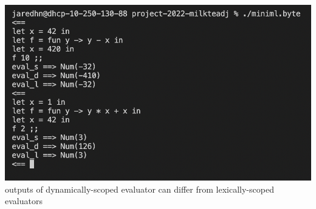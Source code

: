 \documentclass[12pt]{article}
\begin{document}
\begin{center}
\includegraphics[width=15cm]{eval.png}\\
outputs of dynamically-scoped evaluator can differ from lexically-scoped evaluators
\end{center}



\printbibliography %
\end{document}
